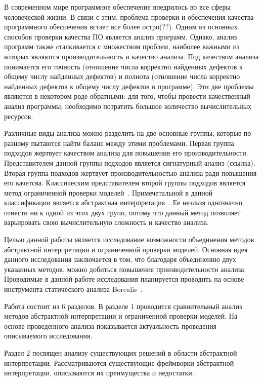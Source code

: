 \intro

В современном мире программное обеспечение внедрилось во все сферы человеческой 
жизни. В связи с этим, проблема проверки и обеспечения качества программного 
обеспечения встает все более остро(??). Одним из основных способов проверки 
качества ПО является анализ программ. Однако, анализ программ также 
cталкивается с множеством проблем, наиболее важными из которых являются 
производительность и качество анализа. Под качеством анализа понимается его 
точность (отношение числа корректно найденных дефектов к общему числу найденных 
де­фектов) и полнота (отношение числа корректно найденных дефектов к общему 
числу дефектов в программе). Эти две проблемы являются в некотором роде 
обратными: для того, чтобы провести качественный анализ программы, необходимо 
потратить большое количество вычислительных ресурсов.

Различные виды анализа можно разделить на две основные группы, которые по-
разному пытаются найти баланс между этими проблемами. Первая группа подходов жертвует качеством анализа для повышения его производительности. Представителем 
данной группы подходов является сигнатурный анализ (ссылка). Вторая группа 
подходов жертвует производительностью анализа ради повышения его качетсва. 
Классическим представителем второй группы подходов является метод ограниченной 
проверки моделей~\cite{bmc}. Примечетальной в данной классификации является 
абстрактная интерпретация~\cite{ai}. Ее незльзя однозначно отнести ни к одной 
из этих двух групп, потому что данный метод позволяет варьировать свою 
вычислительную сложность и качество анализа.

Целью данной работы является исследование возможности объединения методов 
абстрактной интерпретации и ограниченной проверки моделей. Основная идея 
данного исследования заключается в том, что благодаря объединению двух 
указанных методов, можно добиться повышения производительности анализа. 
Проводимые в данной работе исследования планируется проводить на основе 
инструмента статического анализа Borealis~\cite{borealis}.

Работа состоит из 6 разделов. В разделе 1 проводится сравнительный анализ 
методов абстрактной интерпретации и ограниченной проверки моделей. На основе 
проведенного анализа показывается актуальность проведения описываемого 
исследования.

Раздел 2 посвящен анализу существующих решений в области абстрактной 
интерпретации. Рассматриваются существующие фреймворки абстрактной 
интерпретации, описываются их преимущества и недостатки.

